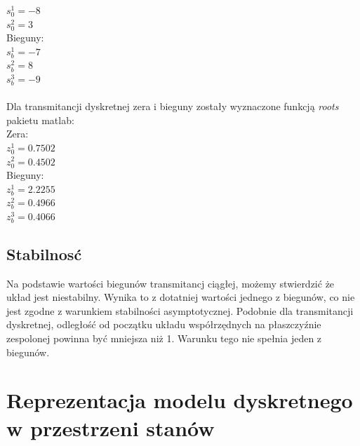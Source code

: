 \documentclass[a4paper, 11pt]{article}
\begin{document}
$s_0^1 = -8$\\

$s_0^2 = 3$\\

\noindent Bieguny: \\

$s_b^1 = -7$\\

$s_b^2 = 8$\\

$s_b^3 = -9$\\
\\
Dla transmitancji dyskretnej zera i bieguny zostały wyznaczone funkcją \emph{roots} pakietu matlab:\\ 
Zera:\\

$z_0^1=0.7502$\\

$z_0^2=0.4502$\\

\noindent Bieguny:\\

$z_b^1 = 2.2255$\\

$z_b^2 =0.4966$\\

$z_b^3 =0.4066$


\subsection{Stabilnosć}
Na podstawie wartości biegunów transmitancj ciągłej, możemy stwierdzić że układ jest niestabilny. Wynika to z dotatniej wartości jednego z biegunów, co nie jest zgodne z warunkiem stabilności asymptotycznej. Podobnie dla transmitancji dyskretnej, odległość od początku układu współrzędnych na płaszczyźnie zespolonej powinna być mniejsza niż 1. Warunku tego nie spełnia jeden z biegunów. 

\section{Reprezentacja modelu dyskretnego w przestrzeni stanów}
\end{document}
